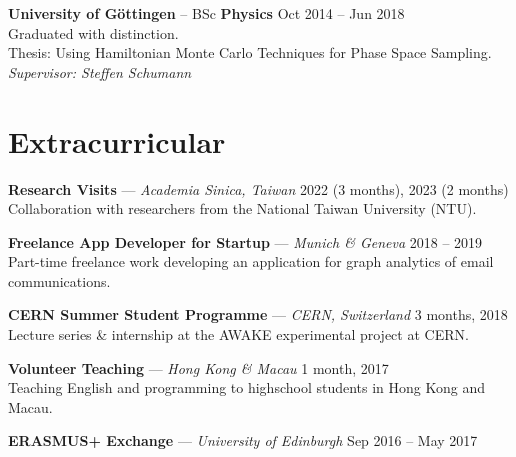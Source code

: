 \documentclass[11pt]{article}
\newcommand{\dateright}[1]{\hfill{\small\color{accentblue} #1}}
\begin{document}
\vspace{0.2cm}

\noindent
\textbf{University of Göttingen} -- BSc \textbf{Physics} \dateright{Oct 2014 -- Jun 2018} \\
Graduated with distinction. \\
Thesis: Using Hamiltonian Monte Carlo Techniques for Phase Space Sampling. \\
\textit{Supervisor: Steffen Schumann}

\section*{Extracurricular}
\noindent
\textbf{Research Visits} — \textit{Academia Sinica, Taiwan} \dateright{2022 (3 months), 2023 (2 months)} \\
Collaboration with researchers from the National Taiwan University (NTU).

\vspace{0.2cm}

\noindent
\textbf{Freelance App Developer for Startup} — \textit{Munich \& Geneva} \dateright{2018 -- 2019} \\
Part-time freelance work developing an
application for graph analytics of email communications.

\vspace{0.2cm}

\noindent
\textbf{CERN Summer Student Programme} — \textit{CERN, Switzerland} \dateright{3 months, 2018} \\
Lecture series \& internship at the AWAKE experimental project at CERN.

\vspace{0.2cm}

\noindent
\textbf{Volunteer Teaching} — \textit{Hong Kong \& Macau} \dateright{1 month, 2017} \\
Teaching English and programming to highschool students in Hong Kong and Macau.
\vspace{0.2cm}

\noindent
\textbf{ERASMUS+ Exchange} — \textit{University of Edinburgh} \dateright{Sep 2016 -- May 2017}
\end{document}
